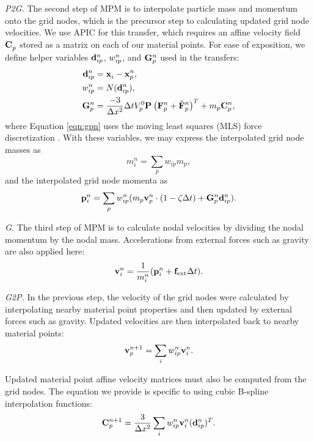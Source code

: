 \emph{P2G.} The second step of MPM is to interpolate particle mass and momentum onto the grid nodes, which is the precursor step to calculating updated grid node velocities.
We use APIC \citep{2015-APIC, jiang2017angular} for this transfer, which requires an affine velocity field $\mathbf{C}_{p} ^{ }$ stored as a matrix on each of our material points.
For ease of exposition, we define helper variables $\mathbf{d}_{i p} ^{n}$, $w_{i p} ^{n}$, and $\mathbf{G}_{p} ^{n}$ used in the transfers:
\begin{align}
    \mathbf{d}_{i p} ^{n} & = \mathbf{x}_{i} ^{ } - \mathbf{x}_{p} ^{n} , \\
    w_{i p} ^{n} & = N(\mathbf{d}_{i p} ^{n}) , \\
    \mathbf{G}_{p} ^{n} & = \frac{-3}{\Delta x^2} \Delta t V_{p} ^0 \mathbf{P}_{ } ^{ }\left( \mathbf{F}_{p} ^{n}+\tilde{\mathbf{F}}_{p} ^{n} \right) ^{T} + m_p \mathbf{C}_{p} ^{n} , \label{eqn:gpn}
\end{align}
where Equation \ref{eqn:gpn} uses the moving least squares (MLS) force discretization \citep{2018-ChainQueen}. 
With these variables, we may express the interpolated grid node masses as
\begin{equation}
    m_i ^n =  \sum_p w_{i p} m_p,
\end{equation}
and the interpolated grid node momenta as
\begin{equation}
    \mathbf{p}_i ^{n} = \sum_p w_{i p} ^{n}(m_p \mathbf{v}_{p} ^{n} \cdot(1-\zeta \Delta t) + \mathbf{G}_{p} ^{n} \mathbf{d}_{i p} ^{n}) .
    \label{eqn:gridp}
\end{equation}

\emph{G.} The third step of {MPM} is to calculate nodal velocities by dividing the nodal momentum by the nodal mass. Accelerations from external forces such as gravity are also applied here:
\begin{equation}
    \mathbf{v}_{i} ^{n} = \frac{1}{m_i ^n}(\mathbf{p}_i ^{n} + \mathbf{f}_{\text{ext}} \Delta t) .
\end{equation}

\emph{G2P.} In the previous step, the velocity of the grid nodes were calculated by interpolating nearby material point properties and then updated by external forces such as gravity. 
Updated velocities are then interpolated back to nearby material points:
\begin{equation}
    \mathbf{v}_{p} ^{n+1} = \sum_i w_{i p} ^{n} \mathbf{v}_{i} ^{n} .
\end{equation}

Updated material point affine velocity matrices \citep{2015-APIC, jiang2017angular} must also be computed from the grid nodes. 
The equation we provide is specific to using cubic B-spline interpolation functions:
\begin{equation}
    \mathbf{C}_{p} ^{n+1} = \frac{3}{\Delta x^2} \sum_i w_{i p} ^{n} \mathbf{v}_{i} ^{n} (\mathbf{d}_{i p} ^{n}) ^{T} .
\end{equation}

